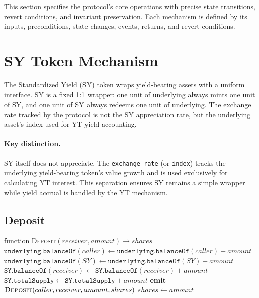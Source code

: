 
This section specifies the protocol's core operations with precise state transitions, revert conditions, and invariant preservation. Each mechanism is defined by its inputs, preconditions, state changes, events, returns, and revert conditions.

\section{SY Token Mechanism}

The Standardized Yield (SY) token wraps yield-bearing assets with a uniform interface. SY is a fixed 1:1 wrapper: one unit of underlying always mints one unit of SY, and one unit of SY always redeems one unit of underlying. The exchange rate tracked by the protocol is not the SY appreciation rate, but the underlying asset's index used for YT yield accounting.

\paragraph{Key distinction.} SY itself does not appreciate. The \texttt{exchange\_rate} (or \texttt{index}) tracks the underlying yield-bearing token's value growth and is used exclusively for calculating YT interest. This separation ensures SY remains a simple wrapper while yield accrual is handled by the YT mechanism.

\subsection{Deposit}

\begin{algorithm}[H]
\caption{SY Deposit}
\underline{function \textsc{Deposit}}$(receiver, amount) \rightarrow shares$\;
\BlankLine
$\texttt{underlying.balanceOf}(caller) \gets \texttt{underlying.balanceOf}(caller) - amount$\;
$\texttt{underlying.balanceOf}(SY) \gets \texttt{underlying.balanceOf}(SY) + amount$\;
$\texttt{SY.balanceOf}(receiver) \gets \texttt{SY.balanceOf}(receiver) + amount$\;
$\texttt{SY.totalSupply} \gets \texttt{SY.totalSupply} + amount$\;
\BlankLine
\textbf{emit} $\textsc{Deposit}(caller, receiver, amount, shares)$\;
\Return $shares \gets amount$\;
\BlankLine
{}
\end{algorithm}

